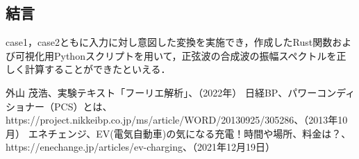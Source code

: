 \documentclass[dvipdfmx,titlepage,a4j]{jsarticle}  %
\begin{document}
\subsection{結言}
case1，case2ともに入力に対し意図した変換を実施でき，作成したRust関数および可視化用Pythonスクリプトを用いて，正弦波の合成波の振幅スペクトルを正しく計算することができたといえる．

\begin{thebibliography}{99}
   外山 茂浩、実験テキスト「フーリエ解析」、（2022年）
   日経BP、パワーコンディショナー（PCS）とは、\\https://project.nikkeibp.co.jp/ms/article/WORD/20130925/305286、（2013年10月）
   エネチェンジ、EV(電気自動車)の気になる充電！時間や場所、料金は？、\\https://enechange.jp/articles/ev-charging、（2021年12月19日）
\end{thebibliography}
\end{document}
